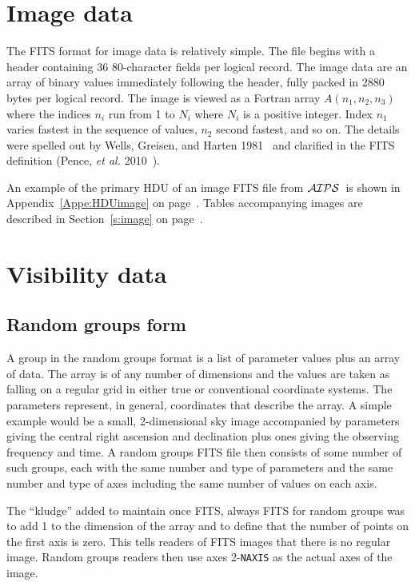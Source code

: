 \documentclass[twoside]{article}
\newcommand{\AIPS}{{$\cal AIPS\/$}}
\begin{document}
\section{Image data}

The FITS format for image data is relatively simple.  The file begins
with a header containing 36 80-character fields per logical record.
The image data are an array of binary values immediately following the
header, fully packed in 2880 bytes per logical record.  The image is
viewed as a Fortran array $A(n_1,n_2,n_3)$ where the indices $n_i$ run
from 1 to $N_i$ where $N_i$ is a positive integer.  Index $n_1$ varies
fastest in the sequence of values, $n_2$ second fastest, and so on.
The details were spelled out by Wells, Greisen, and Harten
1981~\cite{WGH81} and clarified in the FITS definition (Pence, {\it et
  al.} 2010~\cite{PCPSS10}).

An example of the primary HDU of an image FITS file from \AIPS\ is
shown in Appendix~\ref{Appe:HDUimage} on page~\pageref{Appe:HDUimage}.
Tables accompanying images are described in Section~\ref{s:image} on
page~\pageref{s:image}.

\section{Visibility data}

\subsection{Random groups form}
\label{RandomGroup}

A group in the random groups format is a list of parameter values plus
an array of data.  The array is of any number of dimensions and the
values are taken as falling on a regular grid in either true or
conventional coordinate systems.  The parameters represent, in
general, coordinates that describe the array.  A simple example would
be a small, 2-dimensional sky image accompanied by parameters giving
the central right ascension and declination plus ones giving the
observing frequency and time.  A random groups FITS file then consists
of some number of such groups, each with the same number and type of
parameters and the same number and type of axes including the same
number of values on each axis.

The ``kludge'' added to maintain once FITS, always FITS for random
groups was to add 1 to the dimension of the array and to define that
the number of points on the first axis is zero.  This tells readers of
FITS images that there is no regular image.  Random groups readers
then use axes 2-{\tt NAXIS} as the actual axes of the image.
\end{document}
